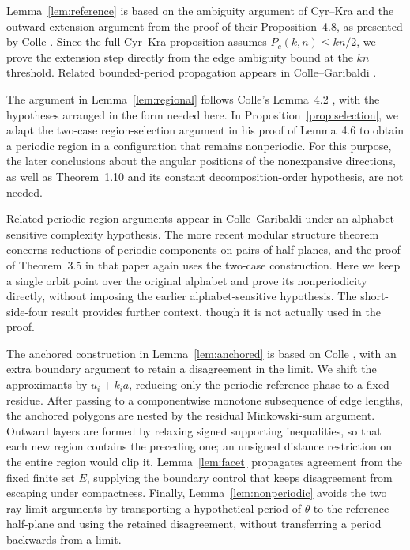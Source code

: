 \documentclass[11pt]{article}
\numberwithin{equation}{section}
\theoremstyle{definition}
\theoremstyle{remark}
\begin{document}
Lemma~\ref{lem:reference} is based on the ambiguity argument of Cyr--Kra \cite[Lemma~2.24]{CK} and the
outward-extension argument from the proof of their Proposition~4.8, as presented by Colle
\cite[Proposition~2.13]{Colle}. Since the full Cyr--Kra proposition assumes $P_c(k,n)\le kn/2$, we
prove the extension step directly from the edge ambiguity bound at the $kn$ threshold. Related
bounded-period propagation appears in Colle--Garibaldi \cite[Lemmas~4.11--4.13]{CG}.

The argument in Lemma~\ref{lem:regional} follows Colle's Lemma~4.2 \cite{Colle}, with the hypotheses
arranged in the form needed here. In Proposition~\ref{prop:selection}, we adapt the two-case
region-selection argument in his proof of Lemma~4.6 to obtain a periodic region in a configuration
that remains nonperiodic. For this purpose, the later conclusions about the angular positions of the
nonexpansive directions, as well as Theorem~1.10 and its constant decomposition-order hypothesis, are
not needed.

Related periodic-region arguments appear in Colle--Garibaldi \cite[Sections~5--6]{CG} under an
alphabet-sensitive complexity hypothesis. The more recent modular structure theorem
\cite[Theorem~1.2]{CG26} concerns reductions of periodic components on pairs of half-planes, and the
proof of Theorem~3.5 in that paper again uses the two-case construction. Here we keep a single orbit
point over the original alphabet and prove its nonperiodicity directly, without imposing the earlier
alphabet-sensitive hypothesis. The short-side-four result provides further context, though it is not
actually used in the proof.

The anchored construction in Lemma~\ref{lem:anchored} is based on Colle \cite[proof of
Lemma~3.5]{Colle}, with an extra boundary argument to retain a disagreement in the limit. We shift the
approximants by $u_i+k_i a$, reducing only the periodic reference phase to a fixed residue. After
passing to a componentwise monotone subsequence of edge lengths, the anchored polygons are nested by
the residual Minkowski-sum argument. Outward layers are formed by relaxing signed supporting
inequalities, so that each new region contains the preceding one; an unsigned distance restriction on
the entire region would clip it. Lemma~\ref{lem:facet} propagates agreement from the fixed finite set
$E$, supplying the boundary control that keeps disagreement from escaping under compactness. Finally,
Lemma~\ref{lem:nonperiodic} avoids the two ray-limit arguments by transporting a hypothetical period
of $\theta$ to the reference half-plane and using the retained disagreement, without transferring a
period backwards from a limit.
\end{document}

